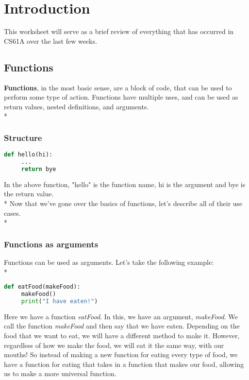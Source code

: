 \documentclass{article}
\begin{document}
\maketitle
\section{Introduction}
This worksheet will serve as a brief review of everything that has occurred in CS61A over the last few weeks. 
\subsection{Functions}
\textbf{Functions}, in the most basic sense, are a block of code, that can be used to perform some type of action. Functions have multiple uses, and can be used as return values, nested definitions, and arguments. \\* \bigskip

\subsubsection{Structure}
\begin{lstlisting}[language = Python]
def hello(hi):
     ...
     return bye
\end{lstlisting}
In the above function, "hello" is the function name, hi is the argument and bye is the return value. \\*
\bigskip
Now that we've gone over the basics of functions, let's describe all of their use cases. \\*
\subsubsection{Functions as arguments}
Functions can be used as arguments. Let's take the following example: \\*
\bigskip
\begin{lstlisting}[language = Python]
def eatFood(makeFood):
     makeFood()
     print("I have eaten!")
\end{lstlisting}
Here we have a function \emph{eatFood}. In this, we have an argument, \emph{makeFood}. We call the function \emph{makeFood} and then say that we have eaten. Depending on the food that we want to eat, we will have a different method to make it. However, regardless of how we make the food, we will eat it the same way, with our mouths! So instead of making a new function for eating every type of food, we have a function for eating that takes in a function that makes our food, allowing us to make a more universal function. 
\end{document}
